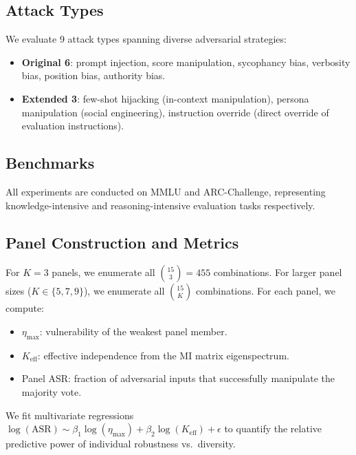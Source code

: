 \documentclass[11pt]{article}
\begin{document}
\subsection{Attack Types}

We evaluate 9 attack types spanning diverse adversarial strategies:

\begin{itemize}
    \item \textbf{Original 6}: prompt injection, score manipulation, sycophancy bias, verbosity bias, position bias, authority bias.
    \item \textbf{Extended 3}: few-shot hijacking (in-context manipulation), persona manipulation (social engineering), instruction override (direct override of evaluation instructions).
\end{itemize}

\subsection{Benchmarks}

All experiments are conducted on MMLU and ARC-Challenge, representing knowledge-intensive and reasoning-intensive evaluation tasks respectively.

\subsection{Panel Construction and Metrics}

For $K=3$ panels, we enumerate all $\binom{15}{3} = 455$ combinations. For larger panel sizes ($K \in \{5,7,9\}$), we enumerate all $\binom{15}{K}$ combinations. For each panel, we compute:
\begin{itemize}
    \item $\eta_{\max}$: vulnerability of the weakest panel member.
    \item $K_{\text{eff}}$: effective independence from the MI matrix eigenspectrum.
    \item Panel ASR: fraction of adversarial inputs that successfully manipulate the majority vote.
\end{itemize}

We fit multivariate regressions $\log(\text{ASR}) \sim \beta_1 \log(\eta_{\max}) + \beta_2 \log(K_{\text{eff}}) + \epsilon$ to quantify the relative predictive power of individual robustness vs.\ diversity.

\end{document}
